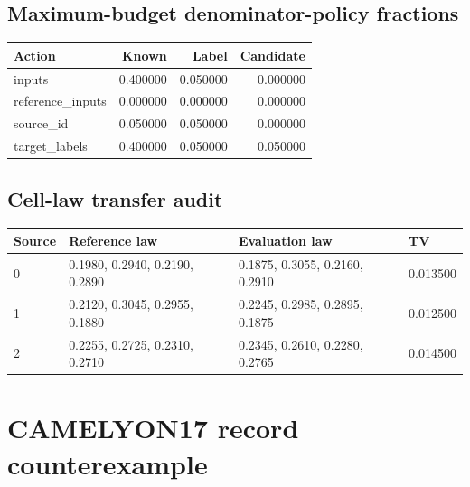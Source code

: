 \reservetable
\subsection{Maximum-budget denominator-policy fractions}

\begingroup\small
\setlength{\tabcolsep}{4pt}
\begin{longtable}{lrrr}
\toprule

Action & Known & Label & Candidate\\\midrule\endhead

inputs & 0.400000 & 0.050000 & 0.000000\\

reference\_inputs & 0.000000 & 0.000000 & 0.000000\\

source\_id & 0.050000 & 0.050000 & 0.000000\\

target\_labels & 0.400000 & 0.050000 & 0.050000\\

\bottomrule
\end{longtable}
\endgroup

\reservetable
\subsection{Cell-law transfer audit}

\begingroup\small
\setlength{\tabcolsep}{4pt}
\begin{longtable}{p{}p{}p{}p{}}
\toprule

Source & Reference law & Evaluation law & TV\\\midrule\endhead

0 & 0.1980, 0.2940, 0.2190, 0.2890 & 0.1875, 0.3055, 0.2160, 0.2910 & 0.013500\\

1 & 0.2120, 0.3045, 0.2955, 0.1880 & 0.2245, 0.2985, 0.2895, 0.1875 & 0.012500\\

2 & 0.2255, 0.2725, 0.2310, 0.2710 & 0.2345, 0.2610, 0.2280, 0.2765 & 0.014500\\

\bottomrule
\end{longtable}
\endgroup

\reservetable
\section{CAMELYON17 record counterexample}

